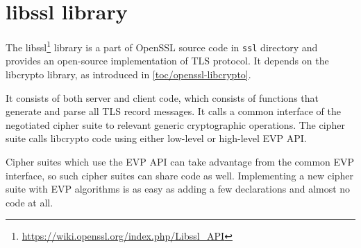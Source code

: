 \section{libssl library}

The libssl\footnote{\url{https://wiki.openssl.org/index.php/Libssl_API}} library is a part of OpenSSL source code in \texttt{ssl} directory and provides an open-source implementation of TLS protocol. It depends on the libcrypto library, as introduced in \autoref{toc/openssl-libcrypto}.

It consists of both server and client code, which consists of functions that generate and parse all TLS record messages. It calls a common interface of the negotiated cipher suite to relevant generic cryptographic operations. The cipher suite calls libcrypto code using either low-level or high-level EVP API.

Cipher suites which use the EVP API can take advantage from the common EVP interface, so such cipher suites can share code as well. Implementing a new cipher suite with EVP algorithms is as easy as adding a few declarations and almost no code at all.
